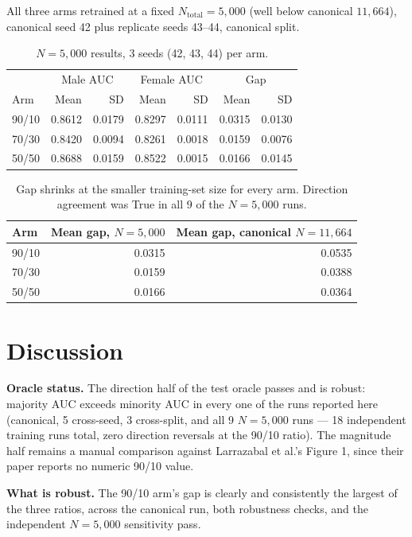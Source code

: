 \documentclass[11pt]{article}
\begin{document}
All three arms retrained at a fixed $N_{\text{total}}=5{,}000$ (well below canonical $11{,}664$), canonical seed 42 plus replicate seeds 43--44, canonical split.

\begin{table}[H]
\centering
\begin{tabular}{lrrrrrr}
\toprule
& \multicolumn{2}{c}{Male AUC} & \multicolumn{2}{c}{Female AUC} & \multicolumn{2}{c}{Gap} \\
Arm & Mean & SD & Mean & SD & Mean & SD \\
\midrule
90/10 & 0.8612 & 0.0179 & 0.8297 & 0.0111 & 0.0315 & 0.0130 \\
70/30 & 0.8420 & 0.0094 & 0.8261 & 0.0018 & 0.0159 & 0.0076 \\
50/50 & 0.8688 & 0.0159 & 0.8522 & 0.0015 & 0.0166 & 0.0145 \\
\bottomrule
\end{tabular}
\caption{$N=5{,}000$ results, 3 seeds (42, 43, 44) per arm.}
\label{tab:nsens}
\end{table}

\begin{table}[H]
\centering
\begin{tabular}{lrr}
\toprule
Arm & Mean gap, $N=5{,}000$ & Mean gap, canonical $N=11{,}664$ \\
\midrule
90/10 & 0.0315 & 0.0535 \\
70/30 & 0.0159 & 0.0388 \\
50/50 & 0.0166 & 0.0364 \\
\bottomrule
\end{tabular}
\caption{Gap shrinks at the smaller training-set size for every arm. Direction agreement was True in all 9 of the $N=5{,}000$ runs.}
\label{tab:nsens_compare}
\end{table}

\section{Discussion}

\textbf{Oracle status.} The direction half of the test oracle passes and is robust: majority AUC exceeds minority AUC in every one of the runs reported here (canonical, 5 cross-seed, 3 cross-split, and all 9 $N=5{,}000$ runs — 18 independent training runs total, zero direction reversals at the 90/10 ratio). The magnitude half remains a manual comparison against Larrazabal et al.'s Figure 1, since their paper reports no numeric 90/10 value.

\textbf{What is robust.} The 90/10 arm's gap is clearly and consistently the largest of the three ratios, across the canonical run, both robustness checks, and the independent $N=5{,}000$ sensitivity pass.
\end{document}
